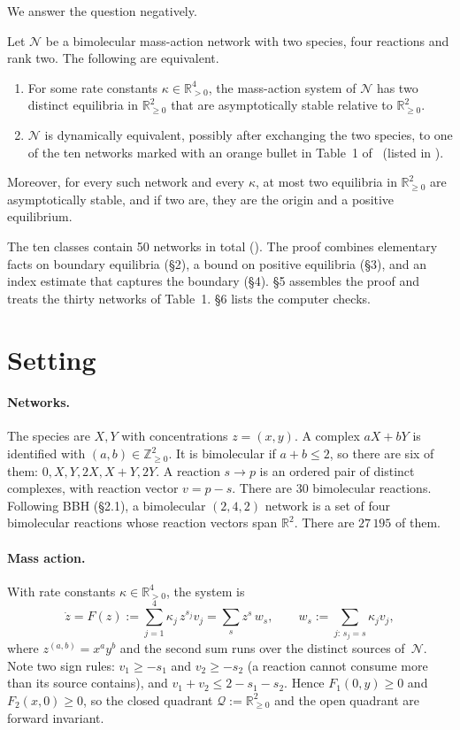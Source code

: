 \documentclass[11pt,a4paper]{report}
\providecommand{\R}{\mathbb{R}}
\newcommand{\Q}{\mathcal{Q}}
\newcommand{\Net}{\mathcal{N}}
\begin{document}
We answer the question negatively.

\begin{theorem}\label{thm:main}
Let \(\Net\) be a bimolecular mass-action network with two species, four reactions and rank two. The following are
equivalent.
\begin{enumerate}
\item For some rate constants \(\kappa\in\R^4_{>0}\), the mass-action system of \(\Net\) has two distinct equilibria
in \(\R^2_{\ge0}\) that are asymptotically stable relative to \(\R^2_{\ge0}\).
\item \(\Net\) is dynamically equivalent, possibly after exchanging the two species, to one of the ten networks
marked with an orange bullet in Table~1 of~\autocite{BBH2024} (listed in ).
\end{enumerate}
Moreover, for every such network and every \(\kappa\), at most two equilibria in \(\R^2_{\ge0}\) are asymptotically
stable, and if two are, they are the origin and a positive equilibrium.
\end{theorem}

The ten classes contain 50 networks in total (). The proof combines elementary facts on boundary
equilibria (§2), a bound on positive equilibria (§3), and an index estimate that captures the boundary (§4). §5
assembles the proof and treats the thirty networks of Table~1. §6 lists the computer checks.

\section{Setting}

\paragraph{Networks.} The species are \(X,Y\) with concentrations \(z=(x,y)\). A complex \(aX+bY\) is identified
with \((a,b)\in\mathbb Z^2_{\ge0}\). It is bimolecular if \(a+b\le2\), so there are six of them:
\(0,X,Y,2X,X+Y,2Y\). A reaction \(s\to p\) is an ordered pair of distinct complexes, with reaction vector \(v=p-s\).
There are \(30\) bimolecular reactions. Following BBH (§2.1), a bimolecular \((2,4,2)\) network is a set of four
bimolecular reactions whose reaction vectors span \(\R^2\). There are \(27\,195\) of them.

\paragraph{Mass action.} With rate constants \(\kappa\in\R^4_{>0}\), the system is
\begin{equation}\label{eq:ma}
\dot z=F(z):=\sum_{j=1}^4\kappa_j\,z^{s_j}v_j=\sum_{s}z^s\,w_s,\qquad w_s:=\sum_{j:\,s_j=s}\kappa_jv_j,
\end{equation}
where \(z^{(a,b)}=x^ay^b\) and the second sum runs over the distinct sources of~\(\Net\). Note two sign rules:
\(v_1\ge-s_1\) and \(v_2\ge-s_2\) (a reaction cannot consume more than its source contains), and
\(v_1+v_2\le 2-s_1-s_2\). Hence \(F_1(0,y)\ge0\) and \(F_2(x,0)\ge0\), so the closed quadrant
\(\Q:=\R^2_{\ge0}\) and the open quadrant are forward invariant.
\end{document}
